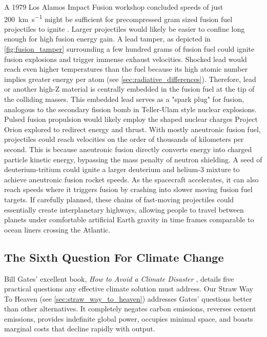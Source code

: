 \documentclass{article}
\begin{document}
A 1979 Los Alamos Impact Fusion workshop concluded speeds of just \SI{200}{\kilo\meter\per\second} might be sufficient for precompressed gram sized fusion fuel projectiles to ignite \cite{impactfusion1979}.   Larger projectiles would likely be easier to confine long enough for high fusion energy gain.   A lead tamper, as depicted in \autoref{fig:fusion_tamper} surrounding a few hundred grams of fusion fuel could ignite fusion explosions and trigger immense exhaust velocities.  Shocked lead would reach even higher temperatures than the fuel because its high atomic number implies greater energy per atom (see \autoref{sec:radiative_differences}).  Therefore, lead or another high-Z material is centrally embedded in the fusion fuel at the tip of the colliding masses. This embedded lead serves as a "spark plug" for fusion, analogous to the secondary fission bomb in Teller-Ulam style \cite{WikipediaThermonuclearWeapon} nuclear explosions. Pulsed fusion propulsion would likely employ the shaped nuclear charges Project Orion explored to redirect energy and thrust.  
With mostly aneutronic fusion fuel, projectiles could reach velocities on the order of thousands of kilometers per second.  This is because aneutronic fusion directly converts energy into charged particle kinetic energy, bypassing the mass penalty of neutron shielding.  A seed of deuterium-tritium could ignite a larger deuterium and helium-3 mixture to achieve aneutronic fusion rocket speeds.   As the spacecraft accelerates, it can also reach speeds where it triggers fusion by crashing into slower moving fusion fuel targets.   If carefully planned, these chains of fast-moving projectiles could essentially create interplanetary highways, allowing people to travel between planets under comfortable artificial Earth gravity in time frames comparable to ocean liners crossing the Atlantic.  

\subsection{The Sixth Question For Climate Change}\label{sec:sith_question}
Bill Gates' excellent book, \textit{How to Avoid a Climate Disaster} \cite{gates2021avoid}, details five practical questions \cite{breakthroughenergy_2021_five} any effective climate solution must address. Our Straw Way To Heaven (see \autoref{sec:straw_way_to_heaven}) addresses Gates' questions better than other alternatives. It completely negates carbon emissions, reverses cement emissions, provides indefinite global power, occupies minimal space, and boasts marginal costs that decline rapidly with output.
\end{document}
